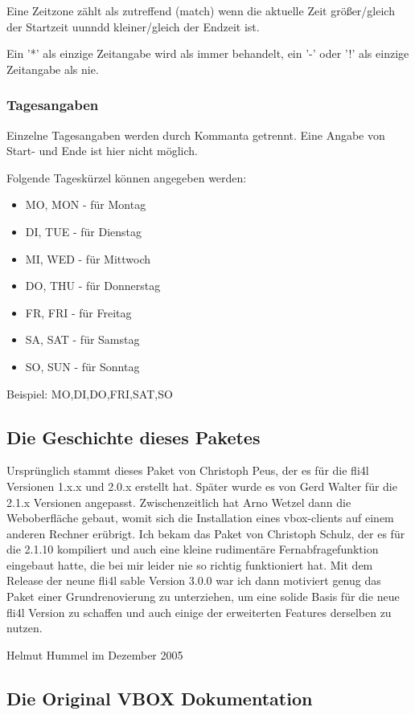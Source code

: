 Eine Zeitzone zählt als zutreffend (match) wenn die aktuelle Zeit größer/gleich 
der Startzeit uunndd kleiner/gleich der Endzeit ist.

Ein '*' als einzige Zeitangabe wird als immer behandelt, ein '-' oder '!' 
als einzige Zeitangabe als nie.


\subsubsection{Tagesangaben}
Einzelne Tagesangaben werden durch Kommanta getrennt. 
Eine Angabe von Start- und Ende ist hier nicht möglich.

Folgende Tageskürzel können angegeben werden:
\begin{itemize}
    \item MO, MON - für Montag
    \item DI, TUE - für Dienstag
    \item MI, WED - für Mittwoch
    \item DO, THU - für Donnerstag
    \item FR, FRI - für Freitag
    \item SA, SAT - für Samstag
    \item SO, SUN - für Sonntag
\end{itemize}

Beispiel:
MO,DI,DO,FRI,SAT,SO

\subsection{Die Geschichte dieses Paketes}
Ursprünglich stammt dieses Paket von Christoph Peus, der es für die fli4l Versionen 1.x.x und
2.0.x erstellt hat. Später wurde es von Gerd Walter für die 2.1.x Versionen angepasst. Zwischenzeitlich
hat Arno Wetzel dann die Weboberfläche gebaut, womit sich die Installation eines vbox-clients auf einem
anderen Rechner erübrigt. Ich bekam das Paket von Christoph Schulz, der es für die 2.1.10 kompiliert
und auch eine kleine rudimentäre Fernabfragefunktion eingebaut hatte, die bei mir leider nie so richtig 
funktioniert hat. Mit dem Release der neune fli4l sable Version 3.0.0 war ich dann motiviert genug
das Paket einer Grundrenovierung zu unterziehen, um eine solide Basis für die neue fli4l Version zu schaffen
und auch einige der erweiterten Features derselben zu nutzen.

Helmut Hummel im Dezember 2005

\subsection{Die Original VBOX Dokumentation}

